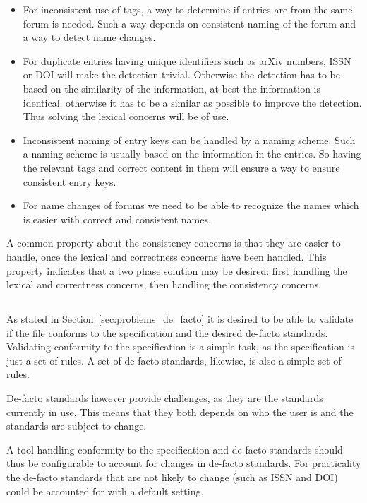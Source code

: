 \begin{itemize}
\item For inconsistent use of tags, a way to determine if entries are
  from the same forum is needed.  Such a way depends on consistent
  naming of the forum and a way to detect name changes.

\item For duplicate entries having unique identifiers such as arXiv
  numbers, ISSN or DOI will make the detection trivial.  Otherwise the
  detection has to be based on the similarity of the information, at
  best the information is identical, otherwise it has to be a similar
  as possible to improve the detection.  Thus solving the lexical
  concerns will be of use.

\item Inconsistent naming of entry keys can be handled by a naming
  scheme.  Such a naming scheme is usually based on the information in
  the entries.  So having the relevant tags and correct content in
  them will ensure a way to ensure consistent entry keys.

\item For name changes of forums we need to be able to recognize the
  names which is easier with correct and consistent names.
\end{itemize}

A common property about the consistency concerns is that they are
easier to handle, once the lexical and correctness concerns have been
handled.  This property indicates that a two phase solution may be
desired: first handling the lexical and correctness concerns, then
handling the consistency concerns.


\subsection{}

As stated in Section~\ref{sec:problems_de_facto} it is desired to be
able to validate if the file conforms to the specification and the
desired de-facto standards.  Validating conformity to the
specification is a simple task, as the specification is just a set of
rules.  A set of de-facto standards, likewise, is also a simple set of
rules.

De-facto standards however provide challenges, as they are the
standards currently in use.  This means that they both depends on who
the user is and the standards are subject to change.

A tool handling conformity to the specification and de-facto standards
should thus be configurable to account for changes in de-facto
standards.  For practicality the de-facto standards that are not
likely to change (such as ISSN and DOI) could be accounted for with a
default setting.



